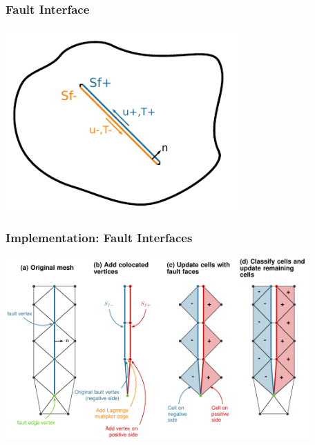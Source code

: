 \documentclass{beamer}
\begin{document}
\begin{frame}[fragile]
  \frametitle{Fault Interface}

  \begin{center}
    \includegraphics[height=7.0cm]{figs/domaindecomp}
  \end{center}

\end{frame}


\begin{frame}
  \frametitle{Implementation: Fault Interfaces}
 
  \begin{center}
    \includegraphics[height=7.0cm]{figs/cohesivecells}
  \end{center}
   
 \end{frame}
 
\end{document}
